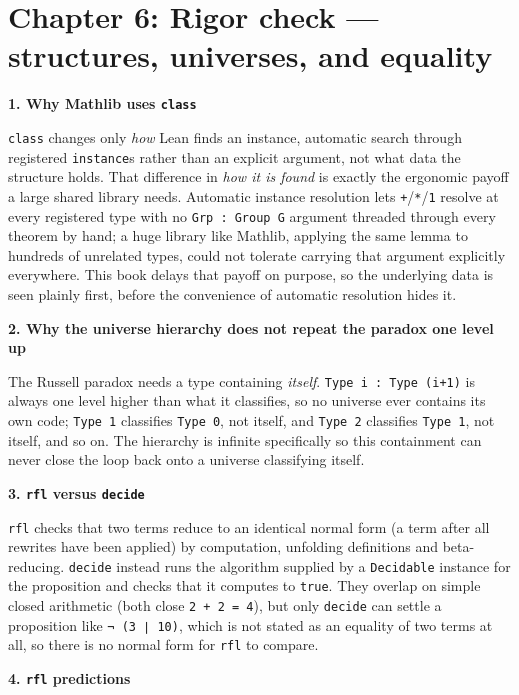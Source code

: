 \section{Chapter 6: Rigor check --- structures, universes, and equality}\label{sec:15-appendix-solutions:06-chapter-6:1}

\textbf{1. Why Mathlib uses \texttt{class}}

\texttt{class} changes only \emph{how} Lean finds an instance, automatic search through registered \texttt{instance}s rather than an explicit argument, not what data the structure holds. That difference in \emph{how it is found} is exactly the ergonomic payoff a large shared library needs. Automatic instance resolution lets \texttt{+}/\texttt{*}/\texttt{1} resolve at every registered type with no \texttt{Grp : Group G} argument threaded through every theorem by hand; a huge library like Mathlib, applying the same lemma to hundreds of unrelated types, could not tolerate carrying that argument explicitly everywhere. This book delays that payoff on purpose, so the underlying data is seen plainly first, before the convenience of automatic resolution hides it.

\textbf{2. Why the universe hierarchy does not repeat the paradox one level up}

The Russell paradox needs a type containing \emph{itself}. \texttt{Type i : Type (i+1)} is always one level higher than what it classifies, so no universe ever contains its own code; \texttt{Type 1} classifies \texttt{Type 0}, not itself, and \texttt{Type 2} classifies \texttt{Type 1}, not itself, and so on. The hierarchy is infinite specifically so this containment can never close the loop back onto a universe classifying itself.

\textbf{3. \texttt{rfl} versus \texttt{decide}}

\texttt{rfl} checks that two terms reduce to an identical normal form (a term after all rewrites have been applied) by computation, unfolding definitions and beta-reducing. \texttt{decide} instead runs the algorithm supplied by a \texttt{Decidable} instance for the proposition and checks that it computes to \texttt{true}. They overlap on simple closed arithmetic (both close \texttt{2 + 2 = 4}), but only \texttt{decide} can settle a proposition like \texttt{¬ (3 ∣ 10)}, which is not stated as an equality of two terms at all, so there is no normal form for \texttt{rfl} to compare.

\textbf{4. \texttt{rfl} predictions}

